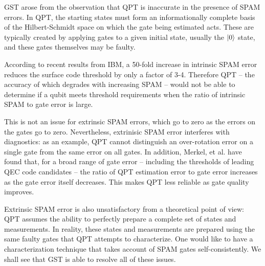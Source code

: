 \documentclass[11pt, oneside]{article}   	%
\begin{document}
GST arose from the observation that QPT is inaccurate in the presence of SPAM errors. 
In QPT, the starting states must form an informationally complete basis of the Hilbert-Schmidt space on which the gate being estimated acts. 
These are typically created by applying gates to a given initial state, usually the $\ket{0}$ state, and these gates themselves may be faulty.

According to recent results from IBM, a 50-fold increase in intrinsic SPAM error reduces the surface code threshold by only a factor of 3-4. 
Therefore QPT -- the accuracy of which degrades with increasing SPAM -- would not be able to determine if a qubit meets threshold requirements when the ratio of intrinsic SPAM to gate error is large.

This is not an issue for extrinsic SPAM errors, which go to zero as the errors on the gates go to zero. 
Nevertheless, extrinisic SPAM error interferes with diagnostics: as an example, QPT cannot distinguish an over-rotation error on a single gate from the same error on all gates. 
In addition, Merkel, et al. have found that, for a broad range of gate error -- including the thresholds of leading QEC code candidates -- the ratio of QPT estimation error to gate error increases as the gate error itself decreases. 
This makes QPT less reliable as gate quality improves.

Extrinsic SPAM error is also unsatisfactory from a theoretical point of view: QPT assumes the ability to perfectly prepare a complete set of states and measurements. 
In reality, these states and measurements are prepared using the same faulty gates that QPT attempts to characterize. 
One would like to have a characterization technique that takes account of SPAM gates self-consistently. 
We shall see that GST is able to resolve all of these issues.
\end{document}
